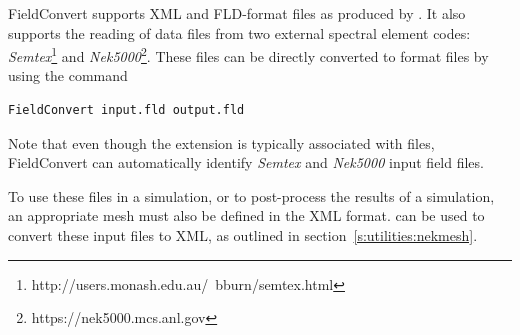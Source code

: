 FieldConvert supports XML and FLD-format files as produced by \nekpp. It also
supports the reading of data files from two external spectral element codes:
\emph{Semtex}\footnote{http://users.monash.edu.au/~bburn/semtex.html} and
\emph{Nek5000}\footnote{https://nek5000.mcs.anl.gov}. These files can be
directly converted to \nekpp format files by using the command
%
\begin{lstlisting}[style=BashInputStyle]
  FieldConvert input.fld output.fld
\end{lstlisting}
%
Note that even though the  extension is typically associated with
\nekpp files, FieldConvert can automatically identify \emph{Semtex} and
\emph{Nek5000} input field files.

To use these files in a simulation, or to post-process the results of a
simulation, an appropriate mesh must also be defined in the \nekpp XML format.
\nm can be used to convert these input files to XML, as outlined in
section~\ref{s:utilities:nekmesh}.

